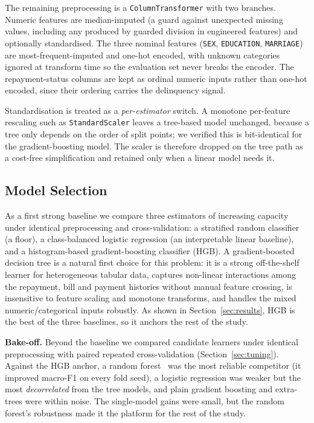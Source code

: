 \documentclass[conference]{IEEEtran}
\begin{document}
The remaining preprocessing is a \texttt{ColumnTransformer} with two branches.
Numeric features are median-imputed (a guard against unexpected missing values,
including any produced by guarded division in engineered features) and optionally
standardised. The three nominal features (\texttt{SEX}, \texttt{EDUCATION},
\texttt{MARRIAGE}) are most-frequent-imputed and one-hot encoded, with unknown
categories ignored at transform time so the evaluation set never breaks the
encoder. The repayment-status columns are kept as ordinal numeric inputs rather
than one-hot encoded, since their ordering carries the delinquency signal.

Standardisation is treated as a \emph{per-estimator} switch. A monotone
per-feature rescaling such as \texttt{StandardScaler} leaves a tree-based model
unchanged, because a tree only depends on the order of split points; we verified
this is bit-identical for the gradient-boosting model. The scaler is therefore
dropped on the tree path as a cost-free simplification and retained only when a
linear model needs it.

\subsection{Model Selection}
\label{sec:model-selection}
As a first strong baseline we compare three estimators of increasing capacity
under identical preprocessing and cross-validation: a stratified random
classifier (a floor), a class-balanced logistic regression (an interpretable
linear baseline), and a histogram-based gradient-boosting classifier (HGB). A
gradient-boosted decision tree is a natural first choice for this problem: it is
a strong off-the-shelf learner for heterogeneous tabular data, captures
non-linear interactions among the repayment, bill and payment histories without
manual feature crossing, is insensitive to feature scaling and monotone
transforms, and handles the mixed numeric/categorical inputs robustly. As shown
in Section~\ref{sec:results}, HGB is the best of the three baselines, so it
anchors the rest of the study.

\textbf{Bake-off.} Beyond the baseline we compared candidate learners under
identical preprocessing with paired repeated cross-validation
(Section~\ref{sec:tuning}). Against the HGB anchor, a random forest~\cite{breiman2001} was the most
reliable competitor (it improved macro-F1 on every fold seed), a logistic
regression was weaker but the most \emph{decorrelated} from the tree models, and
plain gradient boosting and extra-trees were within noise. The single-model gains
were small, but the random forest's robustness made it the platform for the rest
of the study.
\end{document}
